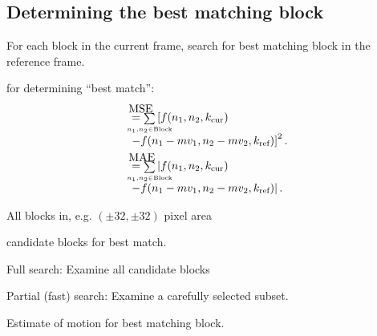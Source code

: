 \begin{compactdesc}
\subsection{Determining the best matching block}
For each block in the current frame, search for best matching block in the reference frame.
	\item[\lp{Metrics}] for determining ``best match'':
		\begin{align*}\dls 
			&\text{MSE}\\[-1em]
			&={\scriptstyle\sum\limits_{\mathclap{n_1,n_2\in\text{Block}}}^{}}\left[f(n_1,n_2,k_{\text{cur}})\right.\\[-1ex]
			&\left.-f(n_1-mv_1,n_2-mv_2,k_{\text{ref}})\right]^2.\\
			&\text{MAE}\\[-1em]
			&={\scriptstyle\sum\limits_{\mathclap{n_1,n_2\in\text{Block}}}^{}}\left|f(n_1,n_2,k_{\text{cur}})\right.\\[-1ex]
			&\left.-f(n_1-mv_1,n_2-mv_2,k_{\text{ref}})\right|.
		\end{align*}
	\item[\lp{Candidate blocks}] All blocks in, e.g. $\left( \pm 32,\pm 32 \right)$ pixel area
	\item[\lp{Strategies for searching}] candidate blocks for best match.\\
		\begin{enumerate*}[label=\protect\circled{\arabic*},itemjoin=]
			\item Full search: Examine all candidate blocks\\
			\item Partial (fast) search: Examine a carefully selected subset.
		\end{enumerate*}
	\item[\lp{Motion vector}] Estimate of motion for best matching block.

\end{compactdesc}
